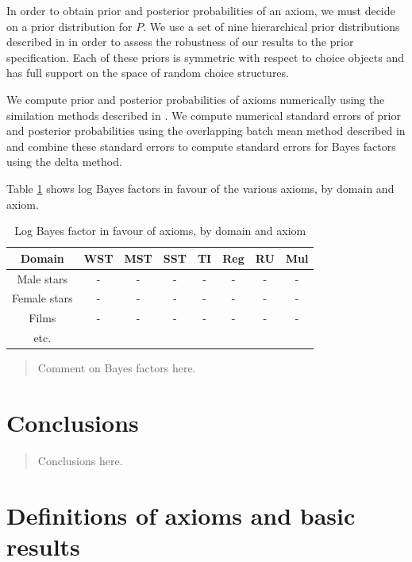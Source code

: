 \documentclass[11pt,letter]{article}
\begin{document}
In order to obtain prior and posterior probabilities of an axiom, we must decide on a prior distribution for $P$.
We use a set of nine hierarchical prior distributions described in  in order to assess the robustness of our results to the prior specification.
Each of these priors is symmetric with respect to choice objects and has full support on the space of random choice structures.

We compute prior and posterior probabilities of axioms numerically using the similation methods described in .
We compute numerical standard errors of prior and posterior probabilities using the overlapping batch mean method described in  and combine these standard errors to compute standard errors for Bayes factors using the delta method.

Table \ref{t:BF} shows log Bayes factors in favour of the various axioms, by domain and axiom.
\begin{table}
	\centering
	\caption{Log Bayes factor in favour of axioms, by domain and axiom}\label{t:BF}
	\begin{tabular}{cccccccc}
		Domain & WST & MST & SST & TI & Reg & RU & Mul \\
		\hline
		Male stars & - & - & - & - & - & - & - \\
		Female stars & - & - & - & - & - & - & - \\
		Films & - & - & - & - & - & - & - \\
		etc. \\
		\hline
	\end{tabular}
\end{table}

\begin{quotation}
	Comment on Bayes factors here.
\end{quotation}

\section{Conclusions}\label{s:conclude}

\begin{quotation}
	Conclusions here.
\end{quotation}

\appendix

\section{Definitions of axioms and basic results}\label{s:axioms}
\end{document}
